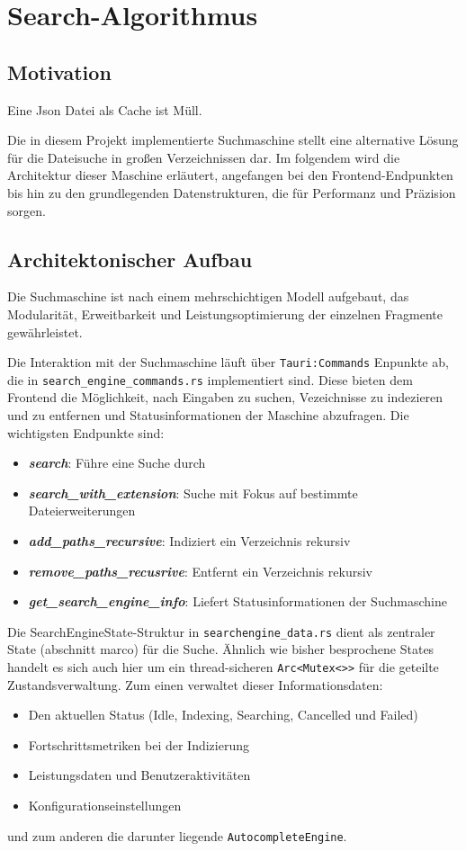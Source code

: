 \section{Search-Algorithmus}
\subsection{Motivation}
Eine Json Datei als Cache ist Müll.

Die in diesem Projekt implementierte Suchmaschine stellt eine alternative Lösung für die Dateisuche in großen Verzeichnissen dar. Im folgendem wird die Architektur dieser Maschine erläutert, angefangen bei den Frontend-Endpunkten bis hin zu den grundlegenden Datenstrukturen, die für Performanz und Präzision sorgen.
\subsection{Architektonischer Aufbau}
Die Suchmaschine ist nach einem mehrschichtigen Modell aufgebaut, das Modularität, Erweitbarkeit und Leistungsoptimierung der einzelnen Fragmente gewährleistet.

Die Interaktion mit der Suchmaschine läuft über \verb|Tauri:Commands| Enpunkte ab, die in \verb|search_engine_commands.rs| implementiert sind. Diese bieten dem Frontend die Möglichkeit, nach Eingaben zu suchen, Vezeichnisse zu indezieren und zu entfernen und Statusinformationen der Maschine abzufragen. Die wichtigsten Endpunkte sind:
\begin{itemize}
	\item \textbf{\textit{search}}: Führe eine Suche durch
	\item \textbf{\textit{search\_with\_extension}}: Suche mit Fokus auf bestimmte Dateierweiterungen
	\item \textbf{\textit{add\_paths\_recursive}}: Indiziert ein Verzeichnis rekursiv
	\item \textbf{\textit{remove\_paths\_recusrive}}: Entfernt ein Verzeichnis rekursiv
	\item \textbf{\textit{get\_search\_engine\_info}}: Liefert Statusinformationen der Suchmaschine
\end{itemize}

Die SearchEngineState-Struktur in \verb|searchengine_data.rs| dient als zentraler State (abschnitt marco) für die Suche. Ähnlich wie bisher besprochene States handelt es sich auch hier um ein thread-sicheren \verb|Arc<Mutex<>>| für die geteilte Zustandsverwaltung. Zum einen verwaltet dieser Informationsdaten:
\begin{itemize}
	\item Den aktuellen Status (Idle, Indexing, Searching, Cancelled und Failed)
	\item Fortschrittsmetriken bei der Indizierung
	\item Leistungsdaten und Benutzeraktivitäten
	\item Konfigurationseinstellungen
\end{itemize}
und zum anderen die darunter liegende \verb|AutocompleteEngine|.

